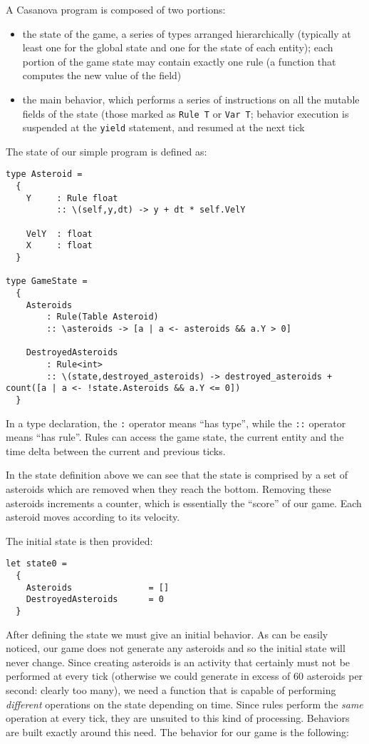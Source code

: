A Casanova program is composed of two portions:
\begin{itemize}
\item the state of the game, a series of types arranged hierarchically (typically at least one for the global state and one for the state of each entity); each portion of the game state may contain exactly one rule (a function that computes the new value of the field)
\item the main behavior, which performs a series of instructions on all the mutable fields of the state (those marked as \texttt{Rule T} or \texttt{Var T}; behavior execution is suspended at the \texttt{yield} statement, and resumed at the next tick
\end{itemize}

The state of our simple program is defined as:

\begin{lstlisting}
type Asteroid =
  {
    Y     : Rule float
          :: \(self,y,dt) -> y + dt * self.VelY
        
    VelY  : float        
    X     : float
  }

type GameState =
  {
    Asteroids           
        : Rule(Table Asteroid)
        :: \asteroids -> [a | a <- asteroids && a.Y > 0]
  	    
    DestroyedAsteroids	
        : Rule<int>
        :: \(state,destroyed_asteroids) -> destroyed_asteroids + count([a | a <- !state.Asteroids && a.Y <= 0])
  }
\end{lstlisting}
  
In a type declaration, the \texttt{:} operator means ``has type'', while the \texttt{::} operator means ``has rule''. Rules can access the game state, the current entity and the time delta between the current and previous ticks.

In the state definition above we can see that the state is comprised by a set of asteroids which are removed when they reach the bottom. Removing these asteroids increments a counter, which is essentially the ``score'' of our game. Each asteroid moves according to its velocity.

The initial state is then provided:
\begin{lstlisting}
let state0 =
  {
    Asteroids               = []
    DestroyedAsteroids      = 0
  }
\end{lstlisting}

After defining the state we must give an initial behavior. As can be easily noticed, our game does not generate any asteroids and so the initial state will never change. Since creating asteroids is an activity that certainly must not be performed at every tick (otherwise we could generate in excess of 60 asteroids per second: clearly too many), we need a function that is capable of performing \textit{different} operations on the state depending on time. Since rules perform the \textit{same} operation at every tick, they are unsuited to this kind of processing. Behaviors are built exactly around this need. The behavior for our game is the following:

